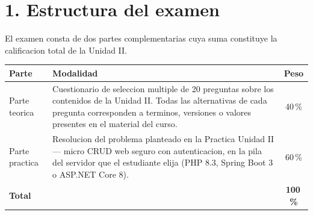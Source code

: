 \documentclass[10pt,a4paper]{article}
\begin{document}
\section*{1. Estructura del examen}
El examen consta de dos partes complementarias cuya suma constituye la calificacion total de la Unidad II.

\vspace{2pt}
\noindent
\begin{tabular}{|C{2.8cm}|C{10.4cm}|c|}
    \hline
    \textbf{Parte} & \textbf{Modalidad} & \textbf{Peso} \\
    \hline
    Parte teorica &
    Cuestionario de seleccion multiple de 20 preguntas sobre los contenidos de la Unidad II. Todas las alternativas de cada pregunta corresponden a terminos, versiones o valores presentes en el material del curso. &
    40\,\% \\
    \hline
    Parte practica &
    Resolucion del problema planteado en la Practica Unidad II --- micro CRUD web seguro con autenticacion, en la pila del servidor que el estudiante elija (PHP 8.3, Spring Boot 3 o ASP.NET Core 8). &
    60\,\% \\
    \hline
    \textbf{Total} & & \textbf{100\,\%} \\
    \hline
\end{tabular}

\end{document}
